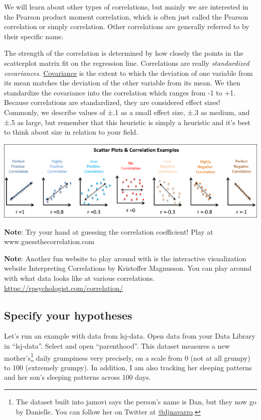 \documentclass[
]{book}
\begin{document}
We will learn about other types of correlations, but mainly we are interested in the Pearson product moment correlation, which is often just called the Pearson correlation or simply correlation. Other correlations are generally referred to by their specific name.

The strength of the correlation is determined by how closely the points in the scatterplot matrix fit on the regression line. Correlations are really \emph{standardized covariances}. \underline{Covariance} is the extent to which the deviation of one variable from its mean matches the deviation of the other variable from its mean. We then standardize the covariance into the correlation which ranges from -1 to +1. Because correlations are standardized, they are considered effect sizes! Commonly, we describe values of ±.1 as a small effect size, ±.3 as medium, and ±.5 as large, but remember that this heuristic is simply a heuristic and it's best to think about size in relation to your field.

\includegraphics{images/08-correlation/correlation-examples.png}

\textbf{Note}: Try your hand at guessing the correlation coefficient! Play at www.guessthecorrelation.com

\textbf{Note}: Another fun website to play around with is the interactive visualization website Interpreting Correlations by Kristoffer Magnusson. You can play around with what data looks like at various correlations. \url{https://rpsychologist.com/correlation/}

\hypertarget{specify-your-hypotheses-6}{%
\subsection{Specify your hypotheses}\label{specify-your-hypotheses-6}}

Let's run an example with data from lsj-data. Open data from your Data Library in ``lsj-data''. Select and open ``parenthood''. This dataset measures a new mother's\footnote{The dataset built into jamovi says the person's name is Dan, but they now go by Danielle. You can follow her on Twitter at \href{https://twitter.com/djnavarro}{@djnavarro}.} daily grumpiness very precisely, on a scale from 0 (not at all grumpy) to 100 (extremely grumpy). In addition, I am also tracking her sleeping patterns and her son's sleeping patterns across 100 days.
\end{document}
